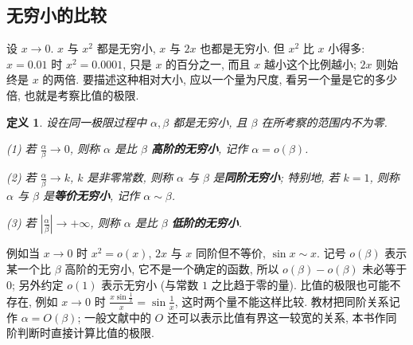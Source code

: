 \documentclass[UTF8,openany]{ctexbook}
\theoremstyle{chinesetextbook}
\newtheorem{definition}{定义}[section]
\begin{document}
\subsection{无穷小的比较}
设 $x\to0$. $x$ 与 $x^2$ 都是无穷小, $x$ 与 $2x$ 也都是无穷小. 但 $x^2$ 比 $x$ 小得多: $x=0.01$ 时 $x^2=0.0001$, 只是 $x$ 的百分之一, 而且 $x$ 越小这个比例越小; $2x$ 则始终是 $x$ 的两倍. 要描述这种相对大小, 应以一个量为尺度, 看另一个量是它的多少倍, 也就是考察比值的极限.
\begin{definition}
设在同一极限过程中 $\alpha,\beta$ 都是无穷小, 且 $\beta$ 在所考察的范围内不为零.

\textup{(1)} 若 $\displaystyle\frac\alpha\beta\to0$, 则称 $\alpha$ 是比 $\beta$ \textbf{高阶的无穷小}, 记作 $\alpha=o(\beta)$.

\textup{(2)} 若 $\displaystyle\frac\alpha\beta\to k$, $k$ 是非零常数, 则称 $\alpha$ 与 $\beta$ 是\textbf{同阶无穷小}; 特别地, 若 $k=1$, 则称 $\alpha$ 与 $\beta$ 是\textbf{等价无穷小}, 记作 $\alpha\sim\beta$.

\textup{(3)} 若 $\displaystyle\left|\frac\alpha\beta\right|\to+\infty$, 则称 $\alpha$ 是比 $\beta$ \textbf{低阶的无穷小}.
\end{definition}
例如当 $x\to0$ 时 $x^2=o(x)$, $2x$ 与 $x$ 同阶但不等价, $\sin x\sim x$. 记号 $o(\beta)$ 表示某一个比 $\beta$ 高阶的无穷小, 它不是一个确定的函数, 所以 $o(\beta)-o(\beta)$ 未必等于 $0$; 另外约定 $o(1)$ 表示无穷小 (与常数 $1$ 之比趋于零的量). 比值的极限也可能不存在, 例如 $x\to0$ 时 $\displaystyle\frac{x\sin\frac1x}x=\sin\frac1x$, 这时两个量不能这样比较. 教材把同阶关系记作 $\alpha=O(\beta)$; 一般文献中的 $O$ 还可以表示比值有界这一较宽的关系, 本书作同阶判断时直接计算比值的极限.
\end{document}
